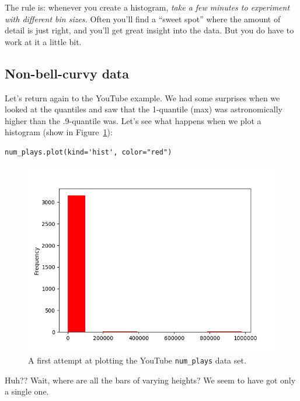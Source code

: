 
The rule is: whenever you create a histogram, \textit{take a few minutes to
experiment with different bin sizes.} Often you'll find a ``sweet spot'' where
the amount of detail is just right, and you'll get great insight into the data.
But you do have to work at it a little bit.

\subsection{Non-bell-curvy data}


Let's return again to the YouTube example. We had some surprises when we looked
at the quantiles and saw that the 1-quantile (max) was astronomically higher
than the .9-quantile was. Let's see what happens when we plot a histogram
(show in Figure~\ref{fig:youtube1}):

\begin{Verbatim}[fontsize=\scriptsize,samepage=true,frame=single,framesep=3mm]
num_plays.plot(kind='hist', color="red")
\end{Verbatim}

\begin{figure}[ht]
\centering
\includegraphics[width=1\textwidth]{youtube1.png}
\caption{A first attempt at plotting the YouTube \texttt{num\_plays} data set.}
\label{fig:youtube1}
\end{figure}

Huh?? Wait, where are all the bars of varying heights? We seem to have got only
a single one.


